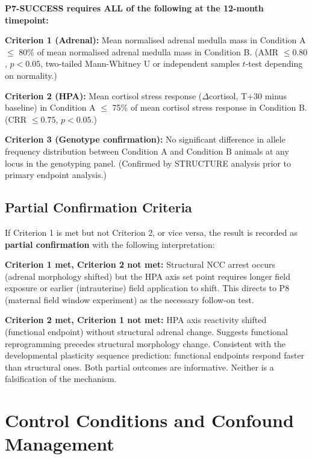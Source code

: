 \documentclass[10pt, a4paper]{article}
\begin{document}
\begin{mdframed}[
  backgroundcolor=notebox,
  linecolor=headergreen,
  linewidth=1pt,
  innertopmargin=0.5em,
  innerbottommargin=0.5em,
  innerleftmargin=0.8em,
  innerrightmargin=0.8em
]
\textbf{P7-SUCCESS requires ALL of the following
at the 12-month timepoint:}

\medskip
\textbf{Criterion 1 (Adrenal):}
Mean normalised adrenal medulla mass in
Condition A $\leq$ 80\% of mean normalised
adrenal medulla mass in Condition B.
(AMR $\leq 0.80$, $p < 0.05$, two-tailed
Mann-Whitney U or independent samples
$t$-test depending on normality.)

\medskip
\textbf{Criterion 2 (HPA):}
Mean cortisol stress response ($\Delta$cortisol,
T$+$30 minus baseline) in Condition A $\leq$
75\% of mean cortisol stress response in
Condition B.
(CRR $\leq 0.75$, $p < 0.05$.)

\medskip
\textbf{Criterion 3 (Genotype confirmation):}
No significant difference in allele frequency
distribution between Condition A and Condition B
animals at any locus in the genotyping panel.
(Confirmed by STRUCTURE analysis prior to
primary endpoint analysis.)
\end{mdframed}

\subsection{Partial Confirmation Criteria}

If Criterion 1 is met but not Criterion 2,
or vice versa, the result is recorded as
\textbf{partial confirmation} with the
following interpretation:

\textbf{Criterion 1 met, Criterion 2 not met:}
Structural NCC arrest occurs (adrenal
morphology shifted) but the HPA axis
set point requires longer field exposure
or earlier (intrauterine) field application
to shift. This directs to P8 (maternal field
window experiment) as the necessary
follow-on test.

\textbf{Criterion 2 met, Criterion 1 not met:}
HPA axis reactivity shifted (functional
endpoint) without structural adrenal change.
Suggests functional reprogramming precedes
structural morphology change. Consistent
with the developmental plasticity sequence
prediction: functional endpoints respond
faster than structural ones.
Both partial outcomes are informative.
Neither is a falsification of the mechanism.

\section{Control Conditions and
Confound Management}
\label{sec:controls}
\end{document}
